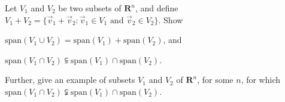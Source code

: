 \documentclass[a4paper,11pt]{article}
\newcommand{\R}{\mathbf{R}}
\begin{document}
 Let $V_1$ and $V_2$ be two subsets of $\R^n$, and
define $V_1+V_2=\{\vec v_1 + \vec v_2 : \vec v_1 \in V_1 \text{ and } \vec v_2
\in V_2 \}$. Show
\begin{enumerate*}[(1)]
\item $\text{span}(V_1 \cup V_2) = \text{span}(V_1) + \text{span}(V_2)$, and
\item $\text{span}(V_1 \cap V_2) \subseteqq \text{span}(V_1) \cap
  \text{span}(V_2)$.
\end{enumerate*}
Further, give an example of subsets $V_1$ and $V_2$ of $\R^n$, for some $n$, for
which $\text{span}(V_1 \cap V_2) \subsetneqq \text{span}(V_1) \cap
\text{span}(V_2)$.
\end{document}
